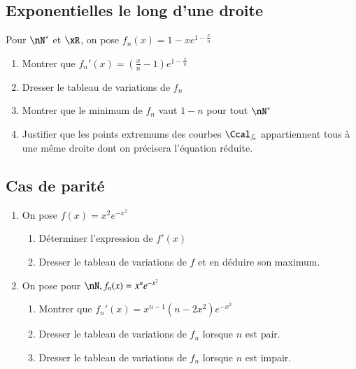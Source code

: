 \documentclass[oneside,12pt]{article}          %
\begin{document}
\subsection{Exponentielles le long d'une droite}
Pour $\nN^*$ et $\xR$, on pose $f_n(x)=1-xe^{\left. 1-\frac{x}{n}\right.} $
\begin{enumerate}
    \item Montrer que $f_n'(x)=\left(\frac{x}{n}-1\right)e^{1-\frac{x}{n}}$
    \item Dresser le tableau de variations de $f_n$
    \item Montrer que le minimum de $f_n$ vaut $1-n$ pour tout $\nN^*$
    \item Justifier que les points extremums des courbes $\Ccal_{f_n}$ appartiennent tous à une même droite dont on précisera l'équation réduite.
\end{enumerate}



\subsection{Cas de parité}
\begin{enumerate}
    \item On pose $f(x)=x^2e^{-x^2}$
    \begin{enumerate}
        \item Déterminer l'expression de $f'(x)$
        \item Dresser le tableau de variations de $f$ et en déduire son maximum.
    \end{enumerate}
    \item On pose pour $\nN, f_n(x)=x^ne^{-x^2}$
    \begin{enumerate}
        \item Montrer que $f_n'(x)=x^{n-1}\left(n-2x^2\right)e^{-x^2}$
        \item Dresser le tableau de variations de $f_n$ lorsque $n$ est pair.
        \item Dresser le tableau de variations de $f_n$ lorsque $n$ est impair.
    \end{enumerate}
\end{enumerate}
\end{document}
